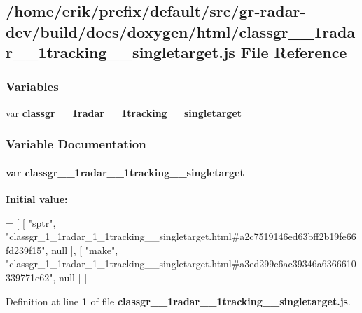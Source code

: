 \subsection{/home/erik/prefix/default/src/gr-\/radar-\/dev/build/docs/doxygen/html/classgr\+\_\+\_\+1radar\+\_\+\_\+1tracking\+\_\+\+\_\+singletarget.js File Reference}
\label{classgr__1__1radar__1__1tracking____singletarget_8js}
\subsubsection*{Variables}
\begin{DoxyCompactItemize}
\item 
var {\bf classgr\+\_\+\_\+1radar\+\_\+\_\+1tracking\+\_\+\+\_\+singletarget}
\end{DoxyCompactItemize}


\subsubsection{Variable Documentation}
\paragraph[{classgr\+\_\+1\+\_\+1radar\+\_\+1\+\_\+1tracking\+\_\+\+\_\+singletarget}]{\setlength{\rightskip}{0pt plus 5cm}var classgr\+\_\+\_\+1radar\+\_\+\_\+1tracking\+\_\+\+\_\+singletarget}\label{classgr__1__1radar__1__1tracking____singletarget_8js_aac18fc1387fa7ac0559fcf268da1a0f2}
{\bfseries Initial value\+:}
\begin{DoxyCode}
=
[
    [ \textcolor{stringliteral}{"sptr"}, \textcolor{stringliteral}{"classgr\_1\_1radar\_1\_1tracking\_\_singletarget.html#a2c7519146ed63bff2b19fe66fd239f15"}, null ],
    [ \textcolor{stringliteral}{"make"}, \textcolor{stringliteral}{"classgr\_1\_1radar\_1\_1tracking\_\_singletarget.html#a3ed299c6ac39346a6366610339771e62"}, null ]
]
\end{DoxyCode}


Definition at line {\bf 1} of file {\bf classgr\+\_\+\_\+1radar\+\_\+\_\+1tracking\+\_\+\+\_\+singletarget.\+js}.

